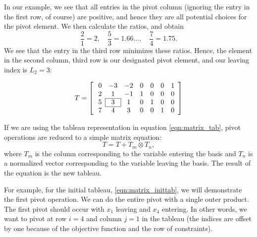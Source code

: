 In our example, we see that all entries in the pivot column (ignoring the entry in the first row, of course) are positive, and hence they are all potential choices for the pivot element.
We then calculate the ratios, and obtain
\[
\frac{2}{1} = 2,\quad \frac{5}{3} = 1.66...,\quad \frac{7}{4} = 1.75.
\]
We see that the entry in the third row minimizes these ratios. Hence, the element in the second column, third row is our designated
pivot element, and our leaving index is $L_2 = 3$:

\[ T = \left[ \:
\begin{array}{*{7}{c}}

0 & -3 & -2 & 0 & 0 & 0 & 1\\
2 & 1 & -1 & 1 & 0 & 0 & 0\\\cline{2-2}
5 & \multicolumn{1}{|c}{3} & \multicolumn{1}{|c}{1} & 0 & 1 & 0 & 0\\\cline{2-2}
7 & 4 & 3 & 0 & 0 & 1 & 0\\
\end{array}
\right] \]

If we are using the tableau representation in equation \ref{eqn:matrix_tab}, pivot operations are reduced to a simple matrix equation:
\[T = T + T_m \otimes T_n,\]
where $T_m$ is the column corresponding to the variable entering the basis and $T_n$ is a normalized vector corresponding to the variable leaving the basis.  The result of the equation is the new tableau.

For example, for the initial tableau, \ref{eqn:matrix_inittab}, we will demonstrate the first pivot operation.
We can do the entire pivot with a single outer product.
The first pivot should occur with $x_1$ leaving and $x_4$ entering.
In other words, we want to pivot at row $i = 4$ and column $j = 1$ in the tableau (the indices are offset by one because of the objective function and the row of constraints).


